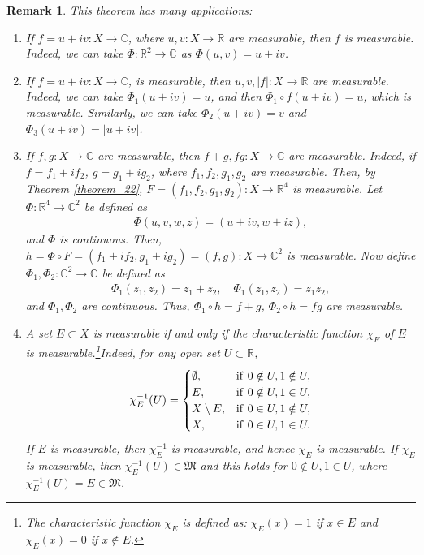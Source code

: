 \documentclass[11pt]{book}
\newtheorem{remark}{Remark}[chapter]
\theoremstyle{definition}
\numberwithin{equation}{chapter}
\begin{document}
\begin{remark}\label{remark_22}
This theorem has many applications:
\begin{enumerate}[label=(\alph*)]
    \item If $f = u + iv: X \to \mathbb{C}$, where $u,v:X\to\mathbb{R}$ are measurable, then $f$ is measurable. Indeed, we can take $\Phi:\mathbb{R}^2 \to \mathbb{C}$ as $\Phi(u,v) = u + iv$.
    
    \item If $f = u + iv: X \to \mathbb{C}$, is measurable, then $u,v,\left|f\right|: X \to \mathbb{R}$ are measurable. Indeed, we can take $\Phi_1(u+iv) = u$, and then $\Phi_1\circ f(u+iv) = u$, which is measurable. Similarly, we can take $\Phi_2(u+iv) = v$ and $\Phi_3(u+iv) = \left|u+iv\right|$.
    
    \item If $f,g: X \to \mathbb{C}$ are measurable, then $f+g,fg: X \to \mathbb{C}$ are measurable. Indeed, if $f = f_1 + if_2$, $g = g_1 + ig_2$, where $f_1,f_2,g_1,g_2$ are measurable. Then, by Theorem \ref{theorem_22}, $F = (f_1,f_2,g_1,g_2): X \to \mathbb{R}^4$ is measurable. Let $\Phi:\mathbb{R}^4 \to \mathbb{C}^2$ be defined as
    \begin{align*}
        \Phi(u,v,w,z) = (u+iv,w+iz),
    \end{align*}
    and $\Phi$ is continuous. Then, $h = \Phi\circ F = (f_1+if_2,g_1+ig_2) = (f,g): X \to \mathbb{C}^2$ is measurable. Now define $\Phi_1, \Phi_2: \mathbb{C}^2 \to \mathbb{C}$ be defined as
    \begin{align*}
        \Phi_1(z_1,z_2) = z_1 + z_2, \quad \Phi_1(z_1,z_2) = z_1 z_2,
    \end{align*}
    and $\Phi_1, \Phi_2$ are continuous. Thus, $\Phi_1\circ h = f+g$, $\Phi_2 \circ h = fg$ are measurable.
    
    \item A set $E \subset X$ is measurable if and only if the characteristic function $\chi_E$ of $E$ is measurable.\footnote{The characteristic function $\chi_E$ is defined as: $\chi_E(x) = 1$ if $x \in E$ and $\chi_E(x) = 0$ if $x \notin E$.}Indeed, for any open set $U \subset \mathbb{R}$,
    \begin{align*}
        \chi_E^{-1}(U) = \begin{cases}
            \emptyset, & {\rm if}\,\, 0 \notin U, 1 \notin U, \\
            E, & {\rm if}\,\, 0 \notin U, 1 \in U, \\
            X \setminus E, & {\rm if}\,\, 0 \in U, 1 \notin U,\\
            X, & {\rm if}\,\, 0 \in U, 1 \in U.
        \end{cases}
    \end{align*}
    If $E$ is measurable, then $\chi_E^{-1}$ is measurable, and hence $\chi_E$ is measurable. If $\chi_E$ is measurable, then $\chi_E^{-1}(U) \in \mathfrak{M}$ and this holds for $0 \notin U, 1 \in U$, where $\chi_E^{-1}(U) = E \in \mathfrak{M}$.
    

\end{enumerate}
\end{remark}
\end{document}
